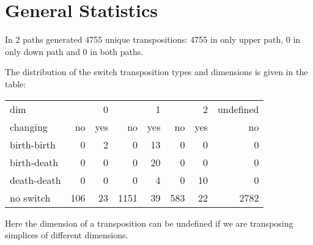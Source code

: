\documentclass{article}
\begin{document}
\section{General Statistics}
\par In 2 paths generated 4755 unique transpositions: 4755 in only upper path, 0 in only down path and 0 in both paths.
\par The distribution of the switch transposition types and dimensions is given in the table:
\begin{center}
\begin{tabular}{lrrrrrrr}
\toprule
dim & \multicolumn{2}{r}{0} & \multicolumn{2}{r}{1} & \multicolumn{2}{r}{2} & undefined \\
changing & no & yes & no & yes & no & yes & no \\
\midrule
birth-birth & 0 & 2 & 0 & 13 & 0 & 0 & 0 \\
birth-death & 0 & 0 & 0 & 20 & 0 & 0 & 0 \\
death-death & 0 & 0 & 0 & 4 & 0 & 10 & 0 \\
no switch & 106 & 23 & 1151 & 39 & 583 & 22 & 2782 \\
\bottomrule
\end{tabular}

\end{center}
Here the dimension of a transposition can be undefined if we are transposing simplices of different dimensions.
\end{document}
